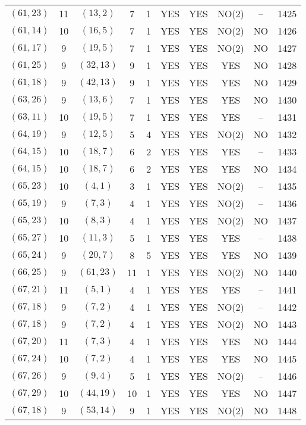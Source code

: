 \begin{longtable}{|c|c|c|c|c|c|c|c|c|c|}
$(61, 23)$ & 11 & $(13, 2)$ & 7 & 1 & YES & YES & NO(2) & -- & 1425\\
$(61, 14)$ & 10 & $(16, 5)$ & 7 & 1 & YES & YES & NO(2) & NO & 1426\\
$(61, 17)$ & 9 & $(19, 5)$ & 7 & 1 & YES & YES & NO(2) & NO & 1427\\
$(61, 25)$ & 9 & $(32, 13)$ & 9 & 1 & YES & YES & YES & NO & 1428\\
$(61, 18)$ & 9 & $(42, 13)$ & 9 & 1 & YES & YES & YES & NO & 1429\\
$(63, 26)$ & 9 & $(13, 6)$ & 7 & 1 & YES & YES & YES & NO & 1430\\
$(63, 11)$ & 10 & $(19, 5)$ & 7 & 1 & YES & YES & YES & -- & 1431\\
$(64, 19)$ & 9 & $(12, 5)$ & 5 & 4 & YES & YES & NO(2) & NO & 1432\\
$(64, 15)$ & 10 & $(18, 7)$ & 6 & 2 & YES & YES & YES & -- & 1433\\
$(64, 15)$ & 10 & $(18, 7)$ & 6 & 2 & YES & YES & YES & NO & 1434\\
$(65, 23)$ & 10 & $(4, 1)$ & 3 & 1 & YES & YES & NO(2) & -- & 1435\\
$(65, 19)$ & 9 & $(7, 3)$ & 4 & 1 & YES & YES & NO(2) & -- & 1436\\
$(65, 23)$ & 10 & $(8, 3)$ & 4 & 1 & YES & YES & NO(2) & NO & 1437\\
$(65, 27)$ & 10 & $(11, 3)$ & 5 & 1 & YES & YES & YES & -- & 1438\\
$(65, 24)$ & 9 & $(20, 7)$ & 8 & 5 & YES & YES & YES & NO & 1439\\
$(66, 25)$ & 9 & $(61, 23)$ & 11 & 1 & YES & YES & NO(2) & NO & 1440\\
$(67, 21)$ & 11 & $(5, 1)$ & 4 & 1 & YES & YES & YES & -- & 1441\\
$(67, 18)$ & 9 & $(7, 2)$ & 4 & 1 & YES & YES & NO(2) & -- & 1442\\
$(67, 18)$ & 9 & $(7, 2)$ & 4 & 1 & YES & YES & NO(2) & NO & 1443\\
$(67, 20)$ & 11 & $(7, 3)$ & 4 & 1 & YES & YES & YES & NO & 1444\\
$(67, 24)$ & 10 & $(7, 2)$ & 4 & 1 & YES & YES & YES & NO & 1445\\
$(67, 26)$ & 9 & $(9, 4)$ & 5 & 1 & YES & YES & NO(2) & -- & 1446\\
$(67, 29)$ & 10 & $(44, 19)$ & 10 & 1 & YES & YES & YES & NO & 1447\\
$(67, 18)$ & 9 & $(53, 14)$ & 9 & 1 & YES & YES & NO(2) & NO & 1448\\

\end{longtable}
